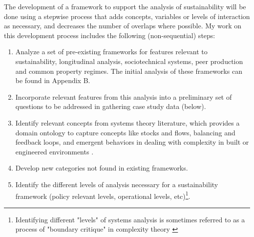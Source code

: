 \documentclass[thesis,tocnosub,noragright,centerchapter,12pt]{uiucecethesis09}
\begin{document}
{The development of a framework to support the analysis of sustainability will be done using a stepwise process that adds concepts, variables or levels of interaction as necessary, and decreases the number of overlaps where possible. My work on this development process includes the following (non-sequential) steps:\\

\begin{enumerate}
\item
Analyze a set of pre-existing frameworks for features relevant to sustainability, longitudinal analysis, sociotechnical systems, peer production and common property regimes. The initial analysis of these frameworks can be found in Appendix B.   
\item 
Incorporate relevant features from this analysis into a preliminary set of questions to be addressed in gathering case study data (below).
\item 
Identify relevant concepts from systems theory literature, which provides a domain ontology to capture concepts like stocks and flows, balancing and feedback loops, and emergent behaviors in dealing with complexity in built or engineered environments \citep[such as ICOADS][]{weinberg1975introduction, easterbrook2014computational}.
\item 
Develop new categories not found in existing frameworks. 
\item 
Identify the different levels of analysis necessary for a sustainability framework (policy relevant levels, operational levels, etc)\footnote{Identifying different "levels" of systems analysis is sometimes referred to as a process of "boundary critique" in complexity theory \citep[e.g.][]{midgley1998theory} }. 
\end{enumerate}


}
\end{document}
